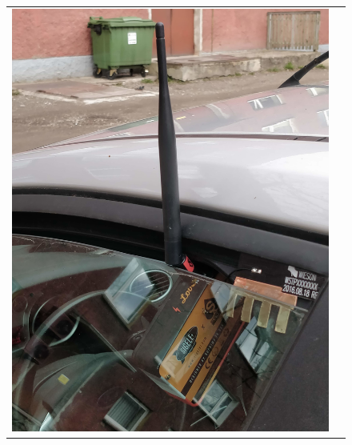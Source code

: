\documentclass[12pt]{article}
\begin{document}
    \begin{figure}[h]
        \begin{center}
        \begin{tabular}{c c}
            \begin{minipage}{0.4\textwidth}
                \includegraphics[width=\textwidth]{figures/fipyautos.jpg}
            \end{minipage}
            &
            \begin{minipage}{0.4\textwidth}

\end{minipage}
\end{tabular}
\end{center}
\end{figure}
\end{document}
